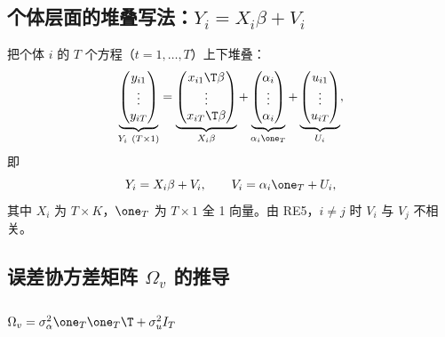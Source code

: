\subsection{个体层面的堆叠写法：\texorpdfstring{$Y_i=X_i\beta+V_i$}{Y\_i = X\_i beta + V\_i}}

把个体 $i$ 的 $T$ 个方程（$t=1,\dots,T$）上下堆叠：
\[
\underbrace{\begin{pmatrix}y_{i1}\\\vdots\\y_{iT}\end{pmatrix}}_{Y_i\ (T\times1)}
=\underbrace{\begin{pmatrix}x_{i1}\T\beta\\\vdots\\x_{iT}\T\beta\end{pmatrix}}_{X_i\beta}
+\underbrace{\begin{pmatrix}\alpha_i\\\vdots\\\alpha_i\end{pmatrix}}_{\alpha_i\one_T}
+\underbrace{\begin{pmatrix}u_{i1}\\\vdots\\u_{iT}\end{pmatrix}}_{U_i},
\]
即
\begin{equation}\label{eq:U11a-stack}
Y_i=X_i\beta+V_i,\qquad V_i=\alpha_i\one_T+U_i ,
\end{equation}
其中 $X_i$ 为 $T\times K$，$\one_T$ 为 $T\times1$ 全 1 向量。由 RE5，$i\neq j$ 时 $V_i$ 与 $V_j$ 不相关。

\subsection{误差协方差矩阵 \texorpdfstring{$\Omega_v$}{Omega\_v} 的推导}

\subsubsection{\texorpdfstring{$\Omega_v=\sigma_\alpha^2\one_T\one_T\T+\sigma_u^2I_T$}{Omega\_v = sigma\_alpha\^2 11' + sigma\_u\^2 I}}

